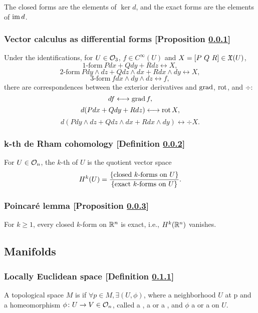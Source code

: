 The closed forms are the elements of $\ker d$, and the exact forms are the elements of $\im d$.

\subsubsection{Vector calculus as differential forms [Proposition \ref{vector-calculus-as-differential-forms}]}\label{vector-calculus-as-differential-forms}
Under the identifications, for $U \in \usualtop[3]$, $f \in C^\infty(U)$ and $X = [P\ Q\ R] \in \g X(U)$,
\[
1\text{-form}\ Pdx + Qdy + Rdz \longleftrightarrow X,
\]
\[
2\text{-form}\ Pdy\wedge dz + Qdz\wedge dx + Rdx\wedge dy \longleftrightarrow X,
\]
\[
3\text{-form}\ f dx\wedge dy\wedge dz \longleftrightarrow f,
\]
there are correspondences between the exterior derivatives and $\grad$, $\rot$, and $\div$:
\[
df \longleftrightarrow \grad f,
\]
\[
d(Pdx + Qdy + Rdz) \longleftrightarrow \rot X,
\]
\[
d(Pdy\wedge dz + Qdz\wedge dx + Rdx\wedge dy) \longleftrightarrow \div X.    
\]

\subsubsection{k-th de Rham cohomology [Definition \ref{k-th-de-rham-cohomology}]}\label{k-th-de-rham-cohomology}
For $U \in \usualtop$, the $k$-th  of $U$ is the quotient vector space
\[
H^k (U) = \fr{\{ \text{closed}\ k\text{-forms on}\ U\}}{\{\text{exact}\ k\text{-forms on}\ U\}}.
\]

\subsubsection{Poincar\'e lemma [Proposition \ref{poincare-lemma}]}\label{poincare-lemma}
For $k \ge 1$, every closed $k$-form on $\bb R^n$ is exact, i.e., $H^k (\bb R^n)$ vanishes.

\subsection{Manifolds}
\subsubsection{Locally Euclidean space [Definition \ref{locally-euclidean-space}]}\label{locally-euclidean-space}
A topological space $M$ is  if $\forall p \in M,\exists (U, \phi)$, where a neighborhood $U$ at p and a homeomorphism $\phi \colon U \to V \in \usualtop$, called a , a  or a , and $\phi$ a  or a  on $U$.

